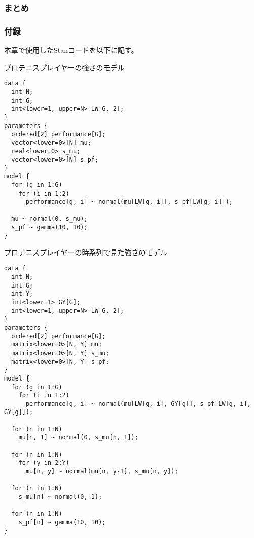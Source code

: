 \documentclass[uplatex,9pt,a5j]{jsarticle}
\begin{document}
\subsubsection{まとめ}

\subsubsection{付録}

本章で使用したStanコードを以下に記す。

\vspace{1em}

\begin{itembox}[l]{プロテニスプレイヤーの強さのモデル}
  \begin{verbatim}
data {
  int N;
  int G;
  int<lower=1, upper=N> LW[G, 2];
}
parameters {
  ordered[2] performance[G];
  vector<lower=0>[N] mu;
  real<lower=0> s_mu; 
  vector<lower=0>[N] s_pf;
}
model {
  for (g in 1:G)
    for (i in 1:2)
      performance[g, i] ~ normal(mu[LW[g, i]], s_pf[LW[g, i]]);
        
  mu ~ normal(0, s_mu);
  s_pf ~ gamma(10, 10);
}
  \end{verbatim}
  \label{cd:cd_model_strength}
\end{itembox}

\vspace{1em}

\begin{itembox}[l]{プロテニスプレイヤーの時系列で見た強さのモデル}
  \begin{verbatim}
data {
  int N;
  int G;
  int Y;
  int<lower=1> GY[G];
  int<lower=1, upper=N> LW[G, 2];
}
parameters {
  ordered[2] performance[G];
  matrix<lower=0>[N, Y] mu;
  matrix<lower=0>[N, Y] s_mu;
  matrix<lower=0>[N, Y] s_pf;
}
model {
  for (g in 1:G)
    for (i in 1:2)
      performance[g, i] ~ normal(mu[LW[g, i], GY[g]], s_pf[LW[g, i], GY[g]]);
        
  for (n in 1:N)
    mu[n, 1] ~ normal(0, s_mu[n, 1]);
            
  for (n in 1:N)
    for (y in 2:Y)
      mu[n, y] ~ normal(mu[n, y-1], s_mu[n, y]);
           
  for (n in 1:N)
    s_mu[n] ~ normal(0, 1);
        
  for (n in 1:N)
    s_pf[n] ~ gamma(10, 10);
}
  \end{verbatim}
  \label{cd:cd_model_strength_ts}
\end{itembox}
\vspace{0.5em}
\end{document}
